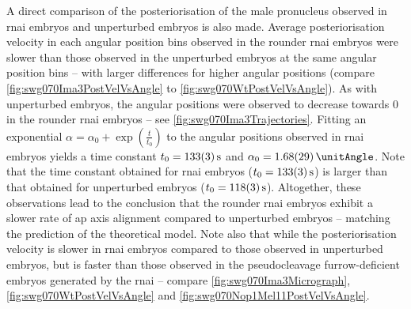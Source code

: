 A direct comparison of the posteriorisation of the male pronucleus observed in  \ac{rnai} embryos and unperturbed embryos is also made. Average posteriorisation velocity in each angular position bins observed in the rounder  \ac{rnai} embryos were slower than those observed in the unperturbed embryos at the same angular position bins --  with larger differences for higher angular positions (compare \autoref{fig:swg070Ima3PostVelVsAngle} to \autoref{fig:swg070WtPostVelVsAngle}). As with unperturbed embryos, the angular positions were observed to decrease towards \SI{0}{\unitAngle} in the rounder  \ac{rnai} embryos -- see \autoref{fig:swg070Ima3Trajectories}. Fitting an exponential $\alpha = \alpha_0 + \exp(\frac{t}{t_0})$ to the angular positions observed in  \ac{rnai} embryos yields a time constant $t_0 = \SI{133 +- 3}{\second}$ and $\alpha_0 = \SI{1.68 +- 0.29}{\unitAngle}$. Note that the time constant obtained for  \ac{rnai} embryos ($t_0 = \SI{133 +- 3}{\second}$) is larger than that obtained for unperturbed embryos ($t_0 = \SI{118 +- 3}{\second}$). Altogether, these observations lead to the conclusion that the rounder  \ac{rnai} embryos exhibit a slower rate of \ac{ap} axis alignment compared to unperturbed embryos -- matching the prediction of the theoretical model. Note also that while the posteriorisation velocity is slower in  \ac{rnai} embryos compared to those observed in unperturbed embryos, but is faster than those observed in the pseudocleavage furrow-deficient embryos generated by the  \ac{rnai} -- compare \autoref{fig:swg070Ima3Micrograph}, \autoref{fig:swg070WtPostVelVsAngle} and \autoref{fig:swg070Nop1Mel11PostVelVsAngle}.

